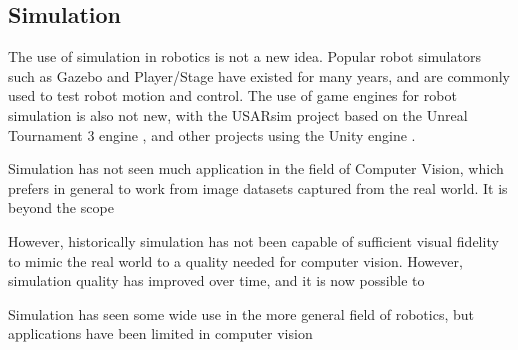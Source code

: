 
\subsection{Simulation}

The use of simulation in robotics is not a new idea.
Popular robot simulators such as Gazebo \cite{Koenig2004} and Player/Stage \cite{Gerkey2003} have existed for many years, and are commonly used to test robot motion and control. The use of game engines for robot simulation is also not new, with the USARsim project based on the Unreal Tournament 3 engine \cite{Carpin2007}, and other projects using the Unity engine \cite{mattingly2012robot}.

Simulation has not seen  much application in the field of Computer Vision, which prefers in general to work from image datasets captured from the real world. It is beyond the scope 

However, historically simulation has not been capable of sufficient visual fidelity to mimic the real world to a quality needed for computer vision. However, simulation quality has improved over time, and it is now possible to 

Simulation has seen some wide use in the more general field of robotics, but applications have been limited in computer vision

